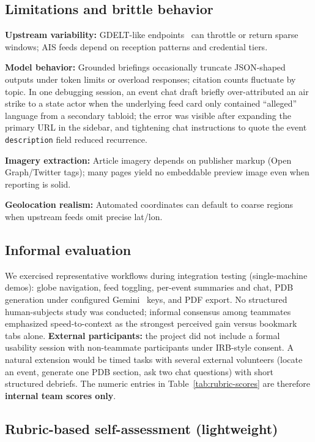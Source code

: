 \subsection{Limitations and brittle behavior}

\textbf{Upstream variability:} GDELT-like endpoints~\cite{gdelt} can throttle or return sparse windows; AIS feeds depend on reception patterns and credential tiers.

\textbf{Model behavior:} Grounded briefings occasionally truncate JSON-shaped outputs under token limits or overload responses; citation counts fluctuate by topic.
In one debugging session, an event chat draft briefly over-attributed an air strike to a state actor when the underlying feed card only contained ``alleged'' language from a secondary tabloid; the error was visible after expanding the primary URL in the sidebar, and tightening chat instructions to quote the event \texttt{description} field reduced recurrence.

\textbf{Imagery extraction:} Article imagery depends on publisher markup (Open Graph/Twitter tags); many pages yield no embeddable preview image even when reporting is solid.

\textbf{Geolocation realism:} Automated coordinates can default to coarse regions when upstream feeds omit precise lat/lon.

\subsection{Informal evaluation}

We exercised representative workflows during integration testing (single-machine demos): globe navigation, feed toggling, per-event summaries and chat, PDB generation under configured Gemini~\cite{gemini-api} keys, and PDF export.
No structured human-subjects study was conducted; informal consensus among teammates emphasized speed-to-context as the strongest perceived gain versus bookmark tabs alone.
\textbf{External participants:} the project did not include a formal usability session with non-teammate participants under IRB-style consent. A natural extension would be timed tasks with several external volunteers (locate an event, generate one PDB section, ask two chat questions) with short structured debriefs. The numeric entries in Table~\ref{tab:rubric-scores} are therefore \textbf{internal team scores only}.

\subsection{Rubric-based self-assessment (lightweight)}


